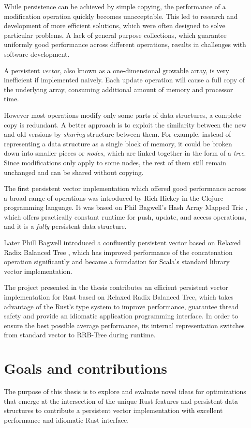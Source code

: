 While persistence can be achieved by simple copying, the performance of a modification operation quickly becomes unacceptable. This led to research and development of more efficient solutions, which were often designed to solve particular problems. A lack of general purpose collections, which guarantee uniformly good performance across different operations, results in challenges with software development.

A persistent \emph{vector}, also known as a one-dimensional growable array, is very inefficient if implemented naively. Each update operation will cause a full copy of the underlying array, consuming additional amount of memory and processor time.

However most operations modify only some parts of data structures, a complete copy is redundant. A better approach is to exploit the similarity between the new and old versions by \emph{sharing} structure between them. For example, instead of representing a data structure as a single block of memory, it could be broken down into smaller pieces or \emph{nodes}, which are linked together in the form of a \emph{tree}. Since modifications only apply to some nodes, the rest of them still remain unchanged and can be shared without copying.

The first persistent vector implementation which offered good performance across a broad range of operations was introduced by Rich Hickey in the Clojure programming language. It was based on Phil Bagwell's Hash Array Mapped Trie \cite{ideal-hash-trees}, which offers practically constant runtime for push, update, and access operations, and it is a \emph{fully} persistent data structure.

Later Phill Bagwell introduced a confluently persistent vector based on Relaxed Radix Balanced Tree \cite{efficient-immutable-vectors}, which has improved performance of the concatenation operation significantly and became a foundation for Scala's standard library vector implementation.

The project presented in the thesis contributes an efficient persistent vector implementation for Rust based on Relaxed Radix Balanced Tree, which takes advantage of the Rust's type system to improve performance, guarantee thread safety and provide an idiomatic application programming interface. In order to ensure the best possible average performance, its internal representation switches from standard vector to RRB-Tree during runtime.

\section{Goals and contributions}
\label{sec:contributions}
The purpose of this thesis is to explore and evaluate novel ideas for optimizations that emerge at the intersection of the unique Rust features and persistent data structures to contribute a persistent vector implementation with excellent performance and idiomatic Rust interface.

